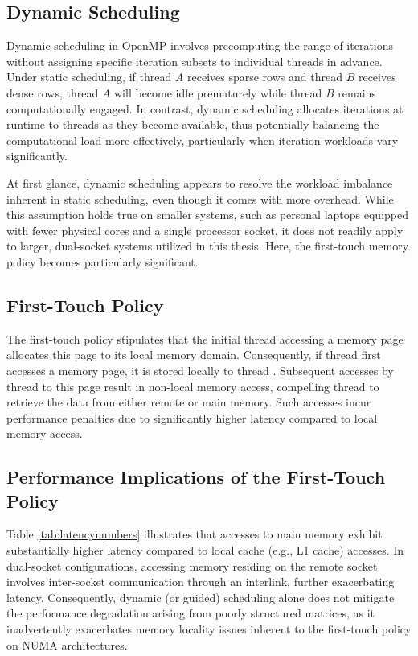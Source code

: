 \subsection{Dynamic Scheduling}

Dynamic scheduling in OpenMP involves precomputing the range of iterations without assigning specific iteration subsets to individual threads in advance. Under static scheduling, if thread \(A\) receives sparse rows and thread \(B\) receives dense rows, thread \(A\) will become idle prematurely while thread \(B\) remains computationally engaged. In contrast, dynamic scheduling allocates iterations at runtime to threads as they become available, thus potentially balancing the computational load more effectively, particularly when iteration workloads vary significantly.

At first glance, dynamic scheduling appears to resolve the workload imbalance inherent in static scheduling, even though it comes with more overhead. While this assumption holds true on smaller systems, such as personal laptops equipped with fewer physical cores and a single processor socket, it does not readily apply to larger, dual-socket systems utilized in this thesis. Here, the first-touch memory policy becomes particularly significant.

\subsection{First-Touch Policy}
The first-touch policy stipulates that the initial thread accessing a memory page allocates this page to its local memory domain. Consequently, if thread  first accesses a memory page, it is stored locally to thread . Subsequent accesses by thread  to this page result in non-local memory access, compelling thread  to retrieve the data from either remote or main memory. Such accesses incur performance penalties due to significantly higher latency compared to local memory access.

\subsection{Performance Implications of the First-Touch Policy}

Table \ref{tab:latencynumbers} illustrates that accesses to main memory exhibit substantially higher latency compared to local cache (e.g., L1 cache) accesses. In dual-socket configurations, accessing memory residing on the remote socket involves inter-socket communication through an interlink, further exacerbating latency. Consequently, dynamic (or guided) scheduling alone does not mitigate the performance degradation arising from poorly structured matrices, as it inadvertently exacerbates memory locality issues inherent to the first-touch policy on NUMA architectures.

